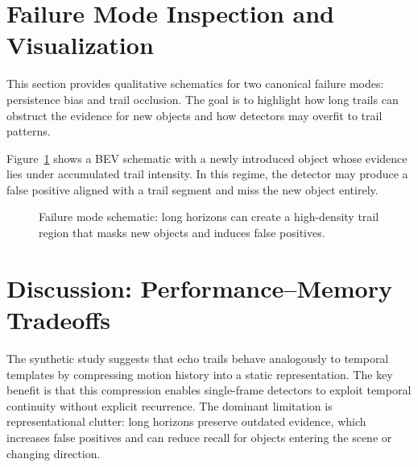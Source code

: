 \documentclass[twocolumn, 10pt]{article}
\begin{document}
\section{Failure Mode Inspection and Visualization}
This section provides qualitative schematics for two canonical failure modes: persistence bias and trail occlusion. The goal is to highlight how long trails can obstruct the evidence for new objects and how detectors may overfit to trail patterns.

Figure~\ref{fig:failure_modes} shows a BEV schematic with a newly introduced object whose evidence lies under accumulated trail intensity. In this regime, the detector may produce a false positive aligned with a trail segment and miss the new object entirely.

\begin{figure}[t]
\centering
{}
\caption{Failure mode schematic: long horizons can create a high-density trail region that masks new objects and induces false positives.}
\label{fig:failure_modes}
\end{figure}

\section{Discussion: Performance--Memory Tradeoffs}
The synthetic study suggests that echo trails behave analogously to temporal templates \cite{BobickDavis2001} by compressing motion history into a static representation. The key benefit is that this compression enables single-frame detectors to exploit temporal continuity without explicit recurrence. The dominant limitation is representational clutter: long horizons preserve outdated evidence, which increases false positives and can reduce recall for objects entering the scene or changing direction.
\end{document}
